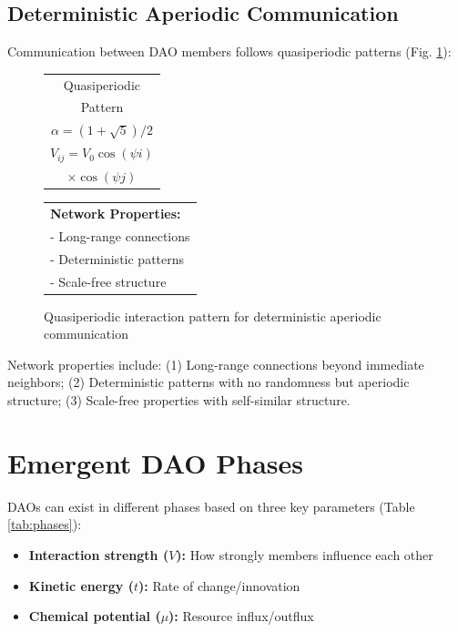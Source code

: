 \documentclass[AMA]{WileyNJD-AMA}
\begin{document}
\subsection{Deterministic Aperiodic Communication}

Communication between DAO members follows quasiperiodic patterns (Fig. \ref{fig:quasiperiodic}):

\begin{figure}[h]
\centering
\begin{minipage}{0.3\textwidth}
\centering
\begin{tabular}{c}
Quasiperiodic \\
Pattern \\
\hline
$\alpha = (1+\sqrt{5})/2$ \\
$V_{ij} = V_0 \cos(\psi i)$ \\
$\times \cos(\psi j)$ \\
\end{tabular}
\end{minipage}
\begin{minipage}{0.65\textwidth}
\centering
\begin{tabular}{p{2in}}
\textbf{Network Properties:} \\
- Long-range connections \\
- Deterministic patterns \\
- Scale-free structure \\
\end{tabular}
\end{minipage}
\caption{Quasiperiodic interaction pattern for deterministic aperiodic communication}
\label{fig:quasiperiodic}
\end{figure}

Network properties include: (1) Long-range connections beyond immediate neighbors; (2) Deterministic patterns with no randomness but aperiodic structure; (3) Scale-free properties with self-similar structure.

\section{Emergent DAO Phases}

DAOs can exist in different phases based on three key parameters (Table \ref{tab:phases}):

\begin{itemize}
    \item \textbf{Interaction strength ($V$):} How strongly members influence each other
    \item \textbf{Kinetic energy ($t$):} Rate of change/innovation
    \item \textbf{Chemical potential ($\mu$):} Resource influx/outflux
\end{itemize}
\end{document}

